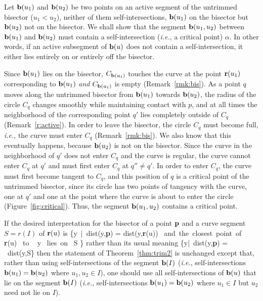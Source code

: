 \prf
Let ${\bf b}(u_{1})$ and ${\bf b}(u_{2})$ be two points
on an active segment of the untrimmed bisector ($u_1 < u_2$),
neither of them self-intersections,
${\bf b}(u_{1})$ on the bisector but
${\bf b}(u_{2})$ not on the bisector.
We shall show that the segment ${\bf b}(u_1,u_2)$ between ${\bf b}(u_{1})$ 
and ${\bf b}(u_{2})$
must contain a self-intersection ({\em i.e.}, a critical point) $\alpha$.
In other words, if an active subsegment of ${\bf b}(u)$ does not contain a 
self-intersection, it either lies entirely on or entirely off the bisector.

Since ${\bf b}(u_{1})$ lies on the bisector,
$C_{{\bf b}(u_{1})}$ touches the curve at the point ${\bf r}(u_{1})$ 
corresponding to ${\bf b}(u_{1})$
{\em and} $C_{{\bf b}(u_{1})}$ is empty (Remark~\ref{rmk:bis}).
As a point $q$ moves along the untrimmed bisector from ${\bf b}(u_{1})$ 
towards ${\bf b}(u_{2})$,
the radius of the circle $C_q$ changes smoothly 
while maintaining contact with $p$,
and at all times the neighborhood of the corresponding point $q'$ lies
completely outside of $C_q$ (Remark~\ref{r:active}).
In order to leave the bisector, the circle $C_q$ must become full, {\em i.e.}, 
the curve must enter $C_q$ (Remark~\ref{rmk:bis}).
We also know that this eventually happens, because ${\bf b}(u_{2})$ 
is not on the bisector.
Since the curve in the neighborhood of $q'$ does not enter $C_q$ 
and the curve is regular, 
the curve cannot enter $C_q$ at $q'$
and must first enter $C_q$ at $q'' \neq q'$.
In order to enter $C_q$, the curve must first become tangent to $C_q$, 
and this position of $q$ is a critical point of the untrimmed
bisector, since its circle has two points of tangency with the curve, one
at $q'$ and one at the point where the curve is about to enter the circle
(Figure~\ref{fig:critical}).
Thus, the segment ${\bf b}(u_1,u_2)$ contains a critical point.
\QED

\begin{rmk}
If the desired interpretation for the bisector of a point ${\bf p}$ 
and a curve segment $S = r(I)$ of ${\bf r}(u)$ is 
\be
	\{y\ |\ {\rm dist}(y,{\bf p}) = {\rm dist}(y,{\bf r}(u)) 
		{\rm \ and\ the\ closest\ point\ of\ } {\bf r}(u) 
		{\rm \ to \ } y {\rm \ lies\ on\ } S \}
\ee
rather than its usual meaning
\be
	\{y|{\rm \ dist}(y,{\bf p}) = 
	    {\rm \ dist}(y,S\}
\ee
then the statement of Theorem~\ref{thm:trim2} is unchanged except that,
rather than using self-intersections of the segment ${\bf b}(I)$ 
({\em i.e.}, self-intersections ${\bf b}(u_1) = {\bf b}(u_2)$
where $u_1, u_2 \in I$),
one should use all self-intersections of ${\bf b}(u)$ that lie on 
the segment ${\bf b}(I)$ 
({\em i.e.}, self-intersections ${\bf b}(u_1) = {\bf b}(u_2)$
where $u_1 \in I$ but $u_2$ need not lie on $I$).
\end{rmk}


